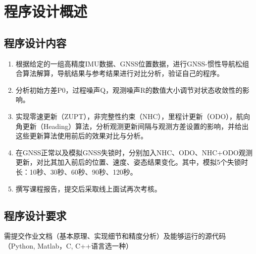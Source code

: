 \documentclass[codepkg=listings,theme=fancy]{course-report}
\begin{document}
%
%
%

\chapter{程序设计概述}
\section{程序设计内容}
\begin{enumerate}
\item 根据给定的一组高精度IMU数据、GNSS位置数据，进行GNSS-惯性导航松组合算法解算，导航结果与参考结果进行对比分析，验证自己的程序。
\item 分析初始方差P0，过程噪声Q，观测噪声R的数值大小调节对状态收敛性的影响。
\item 实现零速更新（ZUPT），非完整性约束（NHC），里程计更新（ODO），航向角更新（Heading）算法，分析观测更新间隔与观测方差设置的影响，并给出这些更新算法使用前后的效果对比与分析。
\item 在GNSS正常以及模拟GNSS失锁时，分别加入NHC、ODO、NHC+ODO观测更新，对比其加入前后的位置、速度、姿态结果变化。其中，模拟5个失锁时长：10秒、30秒、60秒、90秒、120秒。
\item 撰写课程报告，提交后采取线上面试再次考核。
\end{enumerate}
\section{程序设计要求}
需提交作业文档（基本原理、实现细节和精度分析）及能够运行的源代码（Python, Matlab，C, C++语言选一种）
\end{document}
